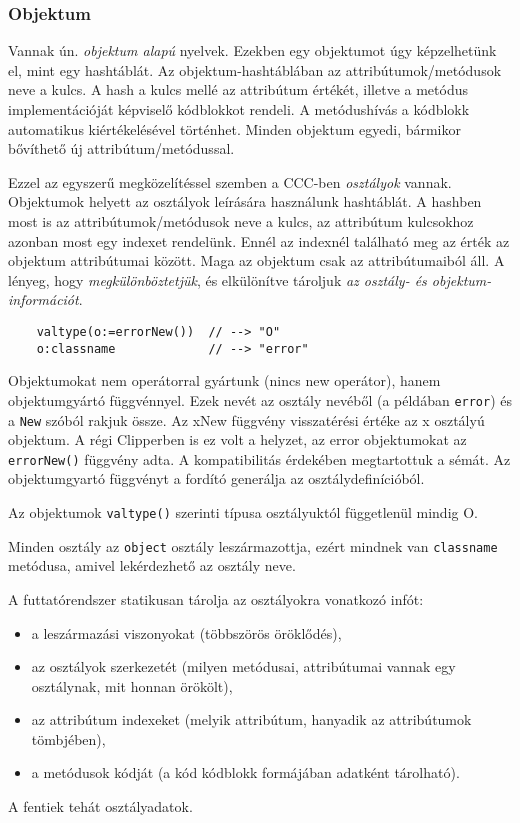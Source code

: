 \subsubsection{Objektum}

Vannak ún. {\em  objektum alapú\/} nyelvek.
Ezekben egy objektumot úgy képzelhetünk el, mint egy hashtáblát.
Az objektum-hashtáblában az attribútumok/metódusok neve a kulcs.
A hash a kulcs mellé az attribútum értékét, illetve a metódus
implementációját képviselő kódblokkot rendeli. A metódushívás
a kódblokk automatikus kiértékelésével történhet. Minden objektum
egyedi, bármikor bővíthető új attribútum/metódussal.

Ezzel az egyszerű megközelítéssel szemben a CCC-ben {\em osztályok\/} vannak.
Objektumok helyett  az osztályok leírására használunk hashtáblát.
A hashben most is az attribútumok/metódusok neve a kulcs,
az attribútum kulcsokhoz azonban most egy indexet rendelünk.
Ennél az indexnél található meg az érték az objektum attribútumai között.
Maga az objektum csak az attribútumaiból áll. 
A lényeg, hogy {\em megkülönböztetjük}, és elkülönítve tároljuk {\em az osztály- 
és objektum-információt}.


\begin{verbatim}
    valtype(o:=errorNew())  // --> "O"
    o:classname             // --> "error"
\end{verbatim}

Objektumokat nem operátorral gyártunk
(nincs new operátor), hanem objektumgyártó függvénnyel.
Ezek nevét az osztály nevéből (a példában \verb!error!) 
és a \verb!New! szóból rakjuk össze. 
Az xNew függvény visszatérési értéke az x osztályú
objektum. A régi Clipperben is ez volt a helyzet, az error objektumokat 
az \verb!errorNew()! függvény adta. A kompatibilitás érdekében megtartottuk
a sémát. Az objektumgyartó függvényt a fordító generálja az osztálydefinícióból.

Az objektumok \verb!valtype()! szerinti típusa osztályuktól 
függetlenül mindig O. 

Minden osztály az \verb!object! osztály leszármazottja, ezért mindnek
van \verb!classname! metódusa, amivel lekérdezhető az osztály neve.


A futtatórendszer statikusan tárolja az osztályokra vonatkozó infót:
\begin{itemize}
  \item a leszármazási viszonyokat (többszörös öröklődés),
  \item az osztályok szerkezetét
        (milyen metódusai, attribútumai vannak egy osztálynak, 
        mit honnan örökölt),
  \item az attribútum indexeket (melyik attribútum, hanyadik az attribútumok tömbjében),
  \item a metódusok kódját (a kód kódblokk formájában adatként tárolható).
\end{itemize}
A fentiek tehát osztályadatok. 

